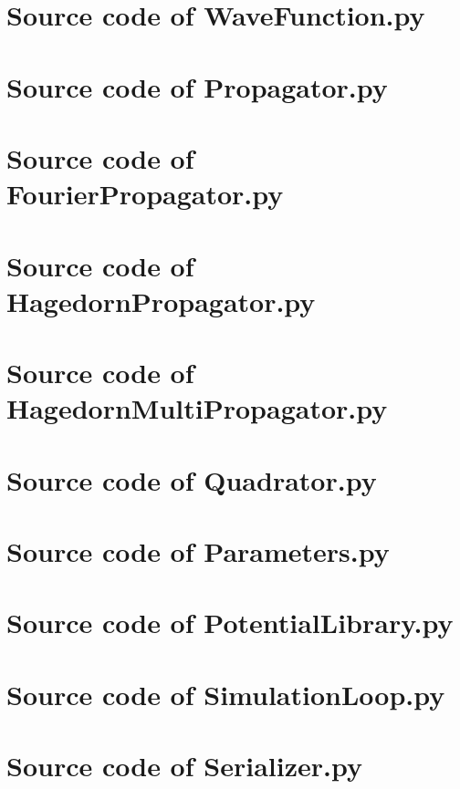 \section{Source code of WaveFunction.py}


\section{Source code of Propagator.py}


\section{Source code of FourierPropagator.py}


\section{Source code of HagedornPropagator.py}


\section{Source code of HagedornMultiPropagator.py}


\section{Source code of Quadrator.py}


\section{Source code of Parameters.py}


\section{Source code of PotentialLibrary.py}


\section{Source code of SimulationLoop.py}


\section{Source code of Serializer.py}

